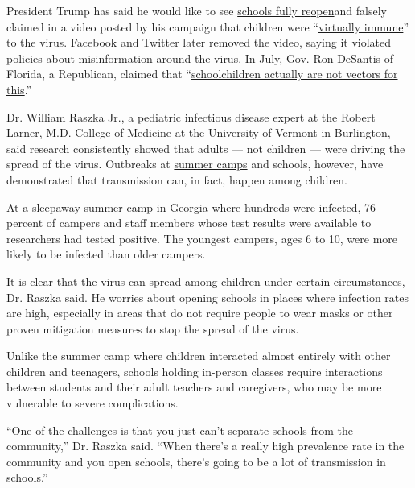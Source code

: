 President Trump has said he would like to see
\href{https://www.whitehouse.gov/briefings-statements/president-donald-j-trump-working-give-students-parents-flexibility-schools-support-need-reopen-fall/}{schools
fully
re}\href{https://www.whitehouse.gov/briefings-statements/president-donald-j-trump-working-give-students-parents-flexibility-schools-support-need-reopen-fall/}{open}and
falsely claimed in a video posted by his campaign that children were
``\href{https://www.nytimes3xbfgragh.onion/2020/08/05/technology/trump-facebook-coronavirus-video.html}{virtually
immune}'' to the virus. Facebook and Twitter later removed the video,
saying it violated policies about misinformation around the virus. In
July, Gov. Ron DeSantis of Florida, a Republican, claimed that
``\href{https://www.c-span.org/video/?473818-1/florida-governor-desantis-coronavirus-news-conference}{schoolchildren
actually are not vectors for this}.''

Dr. William Raszka Jr., a pediatric infectious disease expert at the
Robert Larner, M.D. College of Medicine at the University of Vermont in
Burlington, said research consistently showed that adults --- not
children --- were driving the spread of the virus. Outbreaks at
\href{https://www.nytimes3xbfgragh.onion/2020/07/31/health/coronavirus-children-camp.html}{summer
camps} and schools, however, have demonstrated that transmission can, in
fact, happen among children.

At a sleepaway summer camp in Georgia where
\href{https://www.nytimes3xbfgragh.onion/2020/07/31/health/coronavirus-children-camp.html}{hundreds
were infected}, 76 percent of campers and staff members whose test
results were available to researchers had tested positive. The youngest
campers, ages 6 to 10, were more likely to be infected than older
campers.

It is clear that the virus can spread among children under certain
circumstances, Dr. Raszka said. He worries about opening schools in
places where infection rates are high, especially in areas that do not
require people to wear masks or other proven mitigation measures to stop
the spread of the virus.

Unlike the summer camp where children interacted almost entirely with
other children and teenagers, schools holding in-person classes require
interactions between students and their adult teachers and caregivers,
who may be more vulnerable to severe complications.

``One of the challenges is that you just can't separate schools from the
community,'' Dr. Raszka said. ``When there's a really high prevalence
rate in the community and you open schools, there's going to be a lot of
transmission in schools.''

